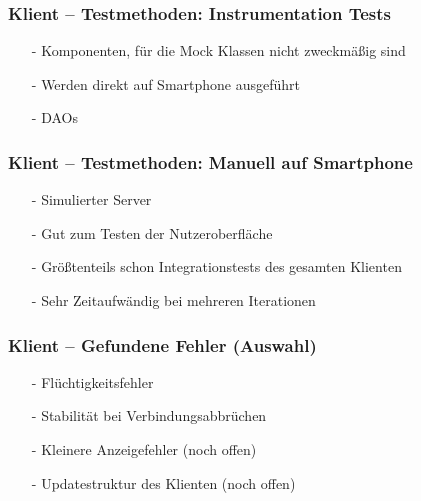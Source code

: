 \documentclass[aspectratio=1610]{beamer}
\begin{document}
\begin{frame}[plain]
        \frametitle{\textbf{Klient} -- Testmethoden: Instrumentation Tests}

        \begin{itemize}
          \item[-] Komponenten, für die Mock Klassen nicht zweckmäßig sind
          \item[-] Werden direkt auf Smartphone ausgeführt
          \item[-] DAOs
        \end{itemize}
  \end{frame}

\begin{frame}[plain]
        \frametitle{\textbf{Klient} -- Testmethoden: Manuell auf Smartphone}

        \begin{itemize}
          \item[-] Simulierter Server
          \item[-] Gut zum Testen der Nutzeroberfläche
          \item[-] Größtenteils schon Integrationstests des gesamten Klienten
          \item[-] Sehr Zeitaufwändig bei mehreren Iterationen
        \end{itemize}
  \end{frame}

\begin{frame}[plain]
        \frametitle{\textbf{Klient} -- Gefundene Fehler (Auswahl)}

        \begin{itemize}
          \item[-] Flüchtigkeitsfehler
          \item[-] Stabilität bei Verbindungsabbrüchen
          \item[-] Kleinere Anzeigefehler (noch offen)
          \item[-] Updatestruktur des Klienten (noch offen)
        \end{itemize}
  \end{frame}
\end{document}
